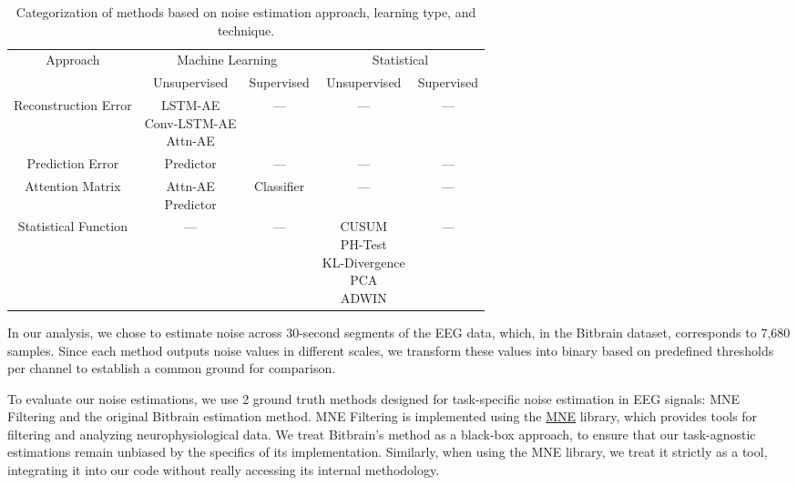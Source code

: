 \begin{table}[ht]
    \renewcommand{\arraystretch}{1.5}
    \setlength{\tabcolsep}{12pt}
    \centering
    \begin{tabular}{|c|c|c|c|c|}
    \hline
    Approach & \multicolumn{2}{c|}{Machine Learning} & \multicolumn{2}{c|}{Statistical} \\ \cline{2-5} 
             & Unsupervised & Supervised & Unsupervised & Supervised \\ \hline
    Reconstruction Error & \parbox[c][2cm][c]{2.3cm}{\raggedright LSTM-AE\\Conv-LSTM-AE\\Attn-AE} & --- & --- & --- \\ \hline
    Prediction Error     & Predictor & --- & --- & --- \\ \hline
    Attention Matrix     & \parbox[c][1.5cm][c]{2.3cm}{\raggedright Attn-AE\\Predictor} & Classifier & --- & --- \\ \hline
    Statistical Function & --- & --- & \parbox[c][3cm][c]{2.5cm}{\raggedright CUSUM\\PH-Test\\KL-Divergence\\PCA\\ADWIN} & --- \\ \hline
    \end{tabular}
    \label{framework-summary}
    \caption{Categorization of methods based on noise estimation approach, learning type, and technique.}
\end{table}

In our analysis, we chose to estimate noise across 30-second segments of the EEG data, which, in the Bitbrain dataset, corresponds to 7,680 samples. Since each method outputs noise values in different scales, we transform these values into binary based on predefined thresholds per channel to establish a common ground for comparison.

To evaluate our noise estimations, we use 2 ground truth methods designed for task-specific noise estimation in EEG signals: MNE Filtering and the original Bitbrain estimation method. MNE Filtering is implemented using the \href{https://mne.tools/stable/index.html}{MNE} library, which provides tools for filtering and analyzing neurophysiological data. We treat Bitbrain's method as a black-box approach, to ensure that our task-agnostic estimations remain unbiased by the specifics of its implementation. Similarly, when using the MNE library, we treat it strictly as a tool, integrating it into our code without really accessing its internal methodology.

